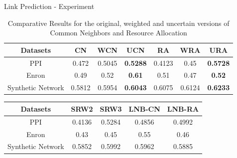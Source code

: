 \documentclass[9pt]{beamer}
\begin{document}
\begin{frame}{Link Prediction - Experiment}

\begin{table}[H]
\centering
\caption{Comparative Results for the original, weighted and uncertain versions of Common Neighbors and Resource Allocation}
\label{experiment-result-link}
\begin{tabular}{c|c|c|c|c|c|c}
\hline
Datasets   & CN      & WCN    & UCN               & RA       & WRA      & URA \\ \hline
PPI                       & 0.472   & 0.5045 & \textbf{0.5288} & 0.4123   & 0.45     & \textbf{0.5728}\\ \hline
Enron                     & 0.49    & 0.52   & \textbf{0.61}   & 0.51     & 0.47     & \textbf{0.52}\\ \hline
Synthetic Network         & 0.5812  & 0.5954 & \textbf{0.6043} & 0.6075   & 0.6124   & \textbf{0.6233}\\ \hline
\end{tabular}

\end{table}

\begin{table}[]
\centering
\begin{tabular}{c|c|c|c|c}
\hline
Datasets          & SRW2 \cite{liu2010link}   & SRW3 \cite{liu2010link}  & LNB-CN \cite{liu2011link} & LNB-RA \cite{liu2011link} \\ \hline
PPI               & 0.4136 & 0.5284 & 0.4856 & 0.4992 \\ \hline
Enron             & 0.43   & 0.45   & 0.55   & 0.46   \\ \hline
Synthetic Network & 0.5852 & 0.5992 & 0.5962 & 0.5885 \\ \hline
\end{tabular}
\end{table}

\end{frame}
\end{document}
